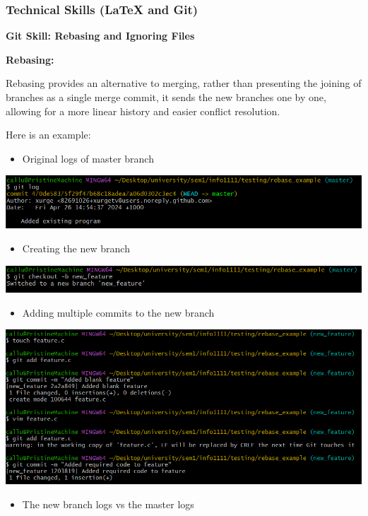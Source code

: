\documentclass[a4paper, 11pt]{report}
\begin{document}
\subsubsection{Technical Skills (LaTeX and Git)}

 \textbf{\large{Git Skill: Rebasing and Ignoring Files}}

\vspace{\baselineskip}
\textbf{Rebasing:}

Rebasing provides an alternative to merging, rather than presenting the joining of branches as a single merge commit, it sends the new branches one by one, allowing for a more linear history and easier conflict resolution.  

Here is an example: 

\begin{itemize}
\item Original logs of master branch 
\end{itemize}
\includegraphics[width=1.1\textwidth]{rebaseinitiallogs}
\begin{itemize}
\item Creating the new branch 
\end{itemize}
\includegraphics[width=1.1\textwidth]{rebasenewbranch}
\begin{itemize}
\item Adding multiple commits to the new branch
\end{itemize}
\includegraphics[width=1.1\textwidth]{rebasecommits}
\begin{itemize}
\item The new branch logs vs the master logs 
\end{itemize}
\end{document}
